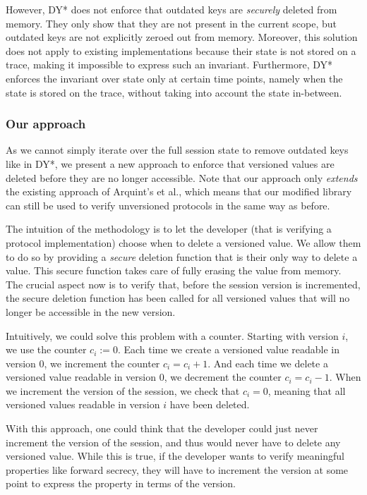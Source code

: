 However, DY* does not enforce that outdated keys are \emph{securely} deleted from memory. They only show that they are not present in the current scope, but outdated keys are not explicitly zeroed out from memory.
Moreover, this solution does not apply to existing implementations because their state is not stored on a trace, making it impossible to express such an invariant.
Furthermore, DY* enforces the invariant over state only at certain time points, namely when the state is stored on the trace, without taking into account the state in-between.

\subsubsection{Our approach}
\label{sec:our-approach}

As we cannot simply iterate over the full session state to remove outdated keys like in DY*, we present a new approach to enforce that versioned values are deleted before they are no longer accessible.
Note that our approach only \emph{extends} the existing approach of Arquint's et al., which means that our modified library can still be used to verify unversioned protocols in the same way as before.

The intuition of the methodology is to let the developer (that is verifying a protocol implementation) choose when to delete a versioned value.
We allow them to do so by providing a \emph{secure} deletion function that is their only way to delete a value. This secure function takes care of fully erasing the value from memory.
The crucial aspect now is to verify that, before the session version is incremented, the secure deletion function has been called for all versioned values that will no longer be accessible in the new version.

Intuitively, we could solve this problem with a counter. Starting with version $i$, we use the counter $c_i:=0$.
Each time we create a versioned value readable in version $0$, we increment the counter $c_i = c_i + 1$.
And each time we delete a versioned value readable in version $0$, we decrement the counter $c_i = c_i - 1$.
When we increment the version of the session, we check that $c_i = 0$, meaning that all versioned values readable in version $i$ have been deleted.

With this approach, one could think that the developer could just never increment the version of the session, and thus would never have to delete any versioned value. While this is true, if the developer wants to verify meaningful properties like forward secrecy, they will have to increment the version at some point to express the property in terms of the version.

